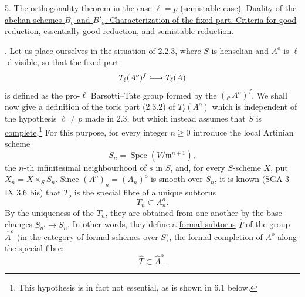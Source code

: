 %

\medskip
\noindent
\underline{5. The orthogonality theorem in the case $\ell=p$
(semistable case).  Duality of the abelian schemes $B_o$ and $B'_o$.
Characterization of the fixed part.  Criteria for good reduction,
essentially good reduction, and semistable reduction.}

\medskip
{}. Let us place ourselves in the situation of 2.2.3, where $S$ is
henselian and $A^o$ is $\ell$-divisible, so that the \underline{fixed
part}
\[
 T_\ell(A^o)^f\lhook\joinrel\longrightarrow T_\ell(A)
\]
is defined as the pro-$\ell$ Barsotti--Tate group formed by the
$({}_{\ell^\nu}A^o)^f$.  We shall now give a definition of the toric
part (2.3.2) of $T_\ell(A^o)$ which is independent of the hypothesis
$\ell\neq p$ made in 2.3, but which instead assumes that $S$ is
\underline{complete}.\footnote{This hypothesis is in fact not
essential, as is shown in 6.1 below.}  For this purpose, for every
integer $n\geq0$ introduce the local Artinian scheme
\begin{equation}\tag{5.1.1}
 S_n=\operatorname{Spec}(V/\mathfrak m^{n+1}),
\end{equation}
the $n$-th infinitesimal neighbourhood of $s$ in $S$, and, for every
$S$-scheme $X$, put $X_n=X\times_S S_n$.  Since
$(A^o)_n=(A_n)^o$ is smooth over $S_n$, it is known (SGA 3 IX 3.6 bis)
that $T_o$ is the special fibre of a unique subtorus
\begin{equation}\tag{5.1.2}
 T_n\subset A_n^o.
\end{equation}
By the uniqueness of the $T_n$, they are obtained from one another by
the base changes $S_{n'}\longrightarrow S_n$.  In other words, they
define a \underline{formal subtorus} $\widehat T$ of the group
$\widehat A^o$ (in the category of formal schemes over $S$), the formal
completion of $A^o$ along the special fibre:
\begin{equation}\tag{5.1.3}
 \widehat T\subset\widehat A^o.
\end{equation}

